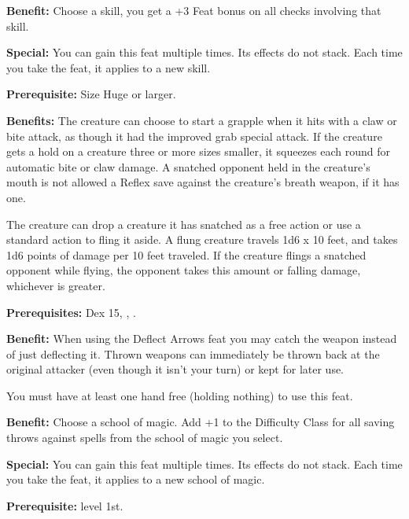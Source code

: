 
\textbf{Benefit:} Choose a skill, you get a +3 Feat bonus on all checks involving that skill.

\textbf{Special:} You can gain this feat multiple times. Its effects do not stack. Each time you take the feat, it applies to a new skill.


\textbf{Prerequisite:} Size Huge or larger.

\textbf{Benefits:} The creature can choose to start a grapple when it hits with a claw or bite attack, as though it had the improved grab special attack. If the creature gets a hold on a creature three or more sizes smaller, it squeezes each round for automatic bite or claw damage. A snatched opponent held in the creature's mouth is not allowed a Reflex save against the creature's breath weapon, if it has one.

The creature can drop a creature it has snatched as a free action or use a standard action to fling it aside. A flung creature travels 1d6 x 10 feet, and takes 1d6 points of damage per 10 feet traveled. If the creature flings a snatched opponent while flying, the opponent takes this amount or falling damage, whichever is greater.


\textbf{Prerequisites:} Dex 15, , .

\textbf{Benefit:} When using the Deflect Arrows feat you may catch the weapon instead of just deflecting it. Thrown weapons can immediately be thrown back at the original attacker (even though it isn't your turn) or kept for later use.

You must have at least one hand free (holding nothing) to use this feat.


\textbf{Benefit:} Choose a school of magic. Add +1 to the Difficulty Class for all saving throws against spells from the school of magic you select.

\textbf{Special:} You can gain this feat multiple times. Its effects do not stack. Each time you take the feat, it applies to a new school of magic.


\textbf{Prerequisite:}  level 1st.

